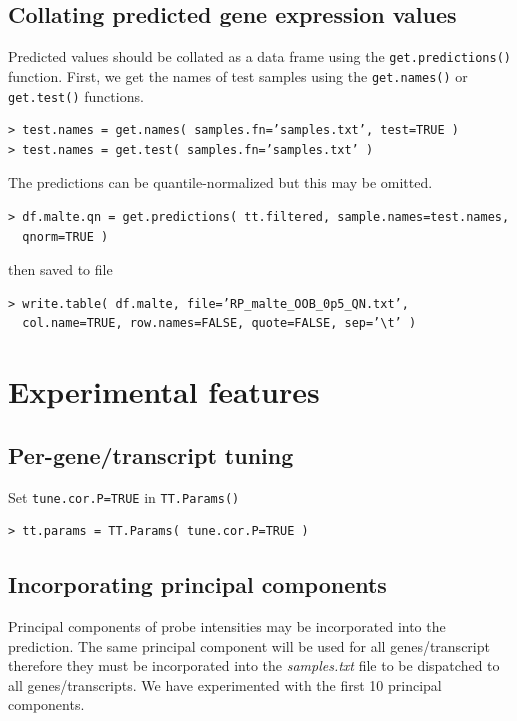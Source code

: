 \documentclass[a4paper,12pt]{article}
\begin{document}
\subsection{Collating predicted gene expression values}

Predicted values should be collated as a data frame using the \texttt{get.predictions()} function. First, we get the names of test samples using the \texttt{get.names()} or \texttt{get.test()} functions.

\begin{verbatim}
> test.names = get.names( samples.fn=’samples.txt’, test=TRUE )
> test.names = get.test( samples.fn=’samples.txt’ )
\end{verbatim}

The predictions can be quantile-normalized but this may be omitted.
	
\begin{verbatim}
> df.malte.qn = get.predictions( tt.filtered, sample.names=test.names, 
  qnorm=TRUE )
\end{verbatim}

then saved to file

\begin{verbatim}
> write.table( df.malte, file=’RP_malte_OOB_0p5_QN.txt’, 
  col.name=TRUE, row.names=FALSE, quote=FALSE, sep=’\t’ )
\end{verbatim}

\pagebreak
\section{Experimental features}

\subsection{Per-gene/transcript tuning}

Set \texttt{tune.cor.P=TRUE} in \texttt{TT.Params()}

\begin{verbatim}
> tt.params = TT.Params( tune.cor.P=TRUE )
\end{verbatim}

\subsection{Incorporating principal components}

Principal components of probe intensities may be incorporated into the prediction. The same principal component will be used for all genes/transcript therefore they must be incorporated into the \textit{samples.txt} file to be dispatched to all genes/transcripts. We have experimented with the first 10 principal components. 
\end{document}
